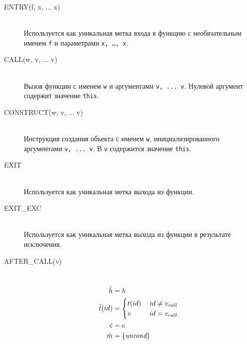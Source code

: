 \begin{description}
  \item[{\small\ttfamily ENTRY(f, x, ... x)}] ~\\%
  Используется как уникальная метка входа в функцию с необязательным
  именем \texttt{f} и параметрами \texttt{x, \ldots, x}.
  \\
   
  \item[{\small\ttfamily CALL(w, v, ... v)}] ~\\%
  Вызов функции с именем \texttt{w} и аргументами \texttt{v, ... v}.
  Нулевой аргумент содержит значение \texttt{this}.
  \\
   
  \item[{\small\ttfamily CONSTRUCT(w, v, ... v)}] ~\\%
  Инструкция создания объекта с именем \texttt{w}, инициализированного
  аргументами \texttt{v, ... v}. В \texttt{v} содержится значение
  \texttt{this}.
  \\
   
  \item[{\small\ttfamily EXIT}] ~\\%
  Используется как уникальная метка выхода из функции.
  \\
   
  \item[{\small\ttfamily EXIT\_EXC}] ~\\%
  Используется как уникальная метка выхода из функции в результате
  исключения.
  \\
   
  \item[{\small\ttfamily AFTER\_CALL(v)}] ~\\%
  \[
  \begin{aligned}
    \tilde{h} &= h\\
    \tilde{t}(id) &= 
      \begin{cases}
	t(id) &\: id \neq v_{call} \\
	v &\: id = v_{call} \\
      \end{cases}\\
    \tilde{e} &= e \\
    \tilde{m} &= \{\emph{uncond}\} \\
  \end{aligned}
  \]
  \\
   

\end{description}
